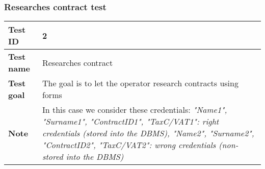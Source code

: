 {{		\subsubsection{Researches contract test}{
			\begin{center}
			\begin{tabular}{|p{4cm}|p{10cm}|}
			\hline
				\centering \vspace{1mm} \bfseries{Test ID} \vspace{1mm} & 
				\vspace{1mm} 2 \vspace{1mm}\\
			\hline
				\centering \vspace{1mm} \bfseries{Test name} \vspace{1mm} & 
				\vspace{1mm} Researches contract\vspace{1mm}\\
			\hline
				\centering \vspace{1mm} \bfseries{Test goal} \vspace{1mm} & 
				\vspace{1mm} The goal is to let the operator research contracts using forms\vspace{1mm}\\
			\hline
				\centering \vspace{1mm} \bfseries{Note} \vspace{1mm} & 
				\vspace{1mm} In this case we consider these credentials: \itshape{"Name1", "Surname1", "ContractID1", "TaxC/VAT1"}: right credentials (stored into the DBMS), \itshape{"Name2", "Surname2", "ContractID2", "TaxC/VAT2"}: wrong credentials (non-stored into the DBMS) \vspace{1mm}\\
			\hline
			\end{tabular}


\end{center}}}}
